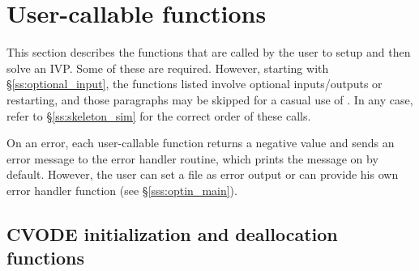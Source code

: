 \section{User-callable functions}\label{ss:callable_fct_sim}

This section describes the {\cvode} functions that are called by the
user to setup and then solve an IVP. Some of these are required. However,
starting with \S\ref{ss:optional_input}, the functions listed involve
optional inputs/outputs or restarting, and those paragraphs may be
skipped for a casual use of {\cvode}. In any case, refer to
\S\ref{ss:skeleton_sim} for the correct order of these calls.

On an error, each user-callable function returns a negative value and
sends an error message to the error handler routine, which prints the
message on  by default. However, the user can set a file
as error output or can provide his own error handler function (see
\S\ref{sss:optin_main}).

\subsection{CVODE initialization and deallocation functions}
\label{sss:cvodemalloc}

